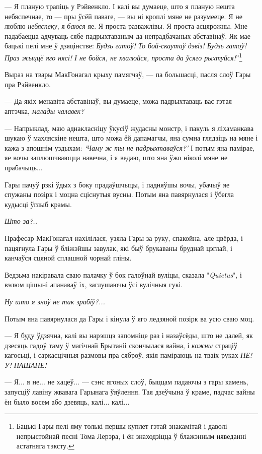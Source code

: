 --- Я планую трапіць у Рэйвенкло. І калі вы думаеце, што я планую нешта небяспечнае,
то --- пры ўсёй паваге, --- вы ні кроплі мяне не разумееце. Я не люблю \emph{небяспеку},
я \emph{баюся} яе. Я проста разважлівы. Я проста асцярожны. Мне падабаецца адчуваць сябе
падрыхтаваным да непрадбачаных абставінаў. Як мае бацькі пелі мне ў дзяцінстве:
\emph{Будзь гатоў! То бой-скаутаў дэвіз! Будзь гатоў! Праз жыццё яго нясі!
І не бойся, не хвалюйся, проста да ўсяго рыхтуйся!}”\footnote{{}
Бацькі Гары пелі яму толькі першы куплет гэтай знакамітай 
і даволі непрыстойнай песні Тома Лерэра,
і ён знаходзіцца ў блажэнным няведанні астатняга тэксту.}

Выраз на твары МакГонагал крыху памягчэў, --- па большасці, пасля слоў Гары пра Рэйвенкло.

--- Да якіх менавіта абставінаў, вы думаеце, можа падрыхтаваць вас гэтая аптэчка, 
\emph{малады чалавек?}

--- Напрыклад, маю аднакласніцу ўкусіў жудасны монстр, і пакуль я ліхаманкава шукаю ў
махляскіне нешта, што можа ёй дапамагчы, яна сумна глядзіць на мяне і кажа
з апошнім уздыхам: \emph{‘Чаму ж ты не падрыхтаваўся?’} І потым яна памірае,
яе вочы заплюшчваюцца навечна, і я ведаю, што яна ўжо ніколі мяне не прабачыць...

Гары пачуў рзкі ўдых з боку прадаўшчыцы, і падняўшы вочы, убачыў яе спужаны позірк і 
моцна сціснутыя вусны. Потым яна павярнулася і ўбегла кудысці ўглыб крамы.

\emph{Што за?..}

Прафесар МакГонагал нахілілася, узяла Гары за руку, спакойна, але цвёрда, і 
пацягнула Гары ў бліжэйшы завулак, які быў брукаваны бруднай цэглай,
і канчаўся сцяной сплашной чорнай гліны.

Ведзьма накіравала сваю палачку ў бок галоўнай вуліцы, сказала "\emph{Quietus}",
і вэлюм цішыні апанаваў іх, заглушаючы ўсі вулічныя гукі.

\emph{Ну што я зноў не так зрабіў?...}

Потым яна павярнулася да Гары і кінула ў яго ледзяной позірк ва усю сваю моц.

--- Я буду ўдзячна, калі вы нарэшцэ запомніце раз і назаўсёды, што не далей,
як дзесяць гадоў таму ў магічнай Брытаніі скончылася вайна, і \emph{кожны} страціў 
кагосьці, і саркасцічныя размовы пра сяброў, якія паміраюць на тваіх
руках \emph{НЕ! У! ПАШАНЕ!}

--- Я... я не... не хацеў... --- сэнс ягоных слоў, быццам падаючы з гары камень,
запусціў лавіну жвавага Гарынага ўяўлення. Тая дзеўчына ў краме, падчас вайны ён было
восем або дзевяць, калі... калі...


